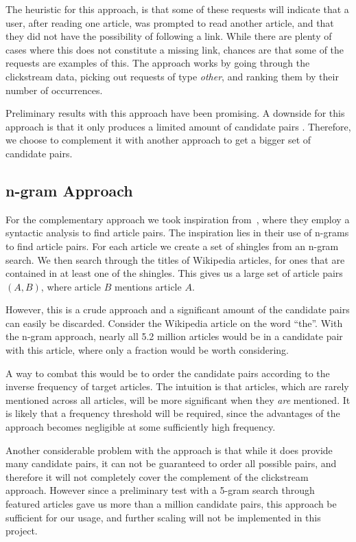 The heuristic for this approach, is that some of these requests will indicate that a user, after reading one article, was prompted to read another article, and that they did not have the possibility of following a link. While there are plenty of cases where this does not constitute a missing link, chances are that some of the requests are examples of this. The approach works by going through the clickstream data, picking out requests of type \emph{other}, and ranking them by their number of occurrences.

Preliminary results with this approach have been promising. A downside for this approach is that it only produces a limited amount of candidate pairs . Therefore, we choose to complement it with another approach to get a bigger set of candidate pairs.

\subsection{n-gram Approach}

For the complementary approach we took inspiration from~\cite{milne2008learning}, where they employ a syntactic analysis to find article pairs. The inspiration lies in their use of n-grams to find article pairs. For each article we create a set of shingles from an n-gram search. We then search through the titles of Wikipedia articles, for ones that are contained in at least one of the shingles. This gives us a large set of article pairs $(A,B)$, where article $B$ mentions article $A$.

However, this is a crude approach and a significant amount of the candidate pairs can easily be discarded. Consider the Wikipedia article on the word \enquote{the}. With the n-gram approach, nearly all 5.2 million articles would be in a candidate pair with this article, where only a fraction would be worth considering.

A way to combat this would be to order the candidate pairs according to the inverse frequency of target articles. The intuition is that articles, which are rarely mentioned across all articles, will be more significant when they \emph{are} mentioned. It is likely that a frequency threshold will be required, since the advantages of the approach becomes negligible at some sufficiently high frequency.

Another considerable problem with the approach is that while it does provide many candidate pairs, it can not be guaranteed to order all possible pairs, and therefore it will not completely cover the complement of the clickstream approach. However since a preliminary test with a 5-gram search through featured articles gave us more than a million candidate pairs, this approach be sufficient for our usage, and further scaling will not be implemented in this project.



